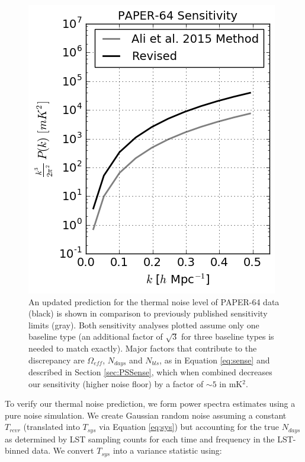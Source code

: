\documentclass[preprint2,numberedappendix,tighten]{aastex6}  %
\begin{document}
\begin{figure}
	\centering
	\includegraphics[width=\columnwidth]{plots/sense_check.png}
	\caption{An updated prediction for the thermal noise level of PAPER-64 data (black) is shown in comparison to previously 
published sensitivity limits (gray). Both sensitivity analyses plotted assume only one baseline type (an additional factor of $
\sqrt{3}$ for three baseline types is needed to match  exactly). Major factors that contribute to the discrepancy are $
\Omega_{eff}$, $N_{days}$ and $N_{bls}$, as in Equation \eqref{eq:sense} and described in Section \ref{sec:PSSense}, which when combined decreases our 
sensitivity (higher noise floor) by a factor of $\sim5$ in mK$^{2}$.}
	\label{fig:sense_check}
\end{figure}

To verify our thermal noise prediction, we form power spectra estimates using a pure noise simulation. We create Gaussian 
random noise assuming a constant $T_{rcvr}$ (translated into $T_{sys}$ via Equation \eqref{eq:sys}) but accounting for the true $N_{days}$ as determined 
by LST sampling counts for each time and frequency in the LST-binned data. We convert $T_{sys}$ into a variance statistic 
using:
\end{document}
